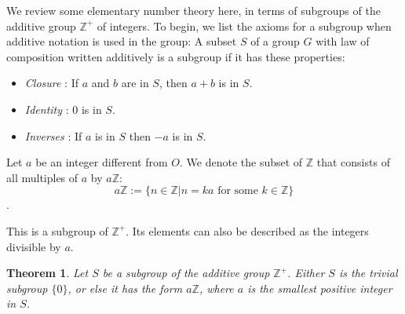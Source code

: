 \documentclass[
]{book}
\providecommand{\tightlist}{%
  \setlength{\itemsep}{0pt}\setlength{\parskip}{0pt}}
\newtheorem{theorem}{Theorem}[chapter]
\theoremstyle{definition}
\theoremstyle{definition}
\theoremstyle{definition}
\theoremstyle{definition}
\theoremstyle{remark}
\begin{document}
We review some elementary number theory here, in terms of subgroups of the additive group \(\mathbb{Z}^+\) of integers. To begin, we list the axioms for a subgroup when additive notation is used in the group: A subset \(S\) of a group \(G\) with law of composition written additively is a subgroup if it has these properties:

\begin{itemize}
\tightlist
\item
  \emph{Closure} : If \(a\) and \(b\) are in \(S\), then \(a + b\) is in \(S\).
\item
  \emph{Identity} : \(0\) is in \(S\).
\item
  \emph{Inverses} : If \(a\) is in \(S\) then \(-a\) is in \(S\).
\end{itemize}

Let \(a\) be an integer different from \(O\).
We denote the subset of \(\mathbb{Z}\) that consists of all
multiples of \(a\) by \(a\mathbb{Z}\):
\[a\mathbb{Z} := \{n \in \mathbb{ Z} | n = ka \text{ for some } k\in \mathbb{Z}\} \].

This is a subgroup of \(\mathbb{Z}^+\). Its elements can also be described as the integers divisible by \(a\).

\begin{theorem}
\protect\hypertarget{thm:unnamed-chunk-21}{}\label{thm:unnamed-chunk-21}Let \(S\) be a subgroup of the additive group \(\mathbb{Z}^+\). Either \(S\) is the trivial subgroup
\(\{0\}\), or else it has the form \(a\mathbb{Z}\), where \(a\) is the smallest positive integer in \(S\).
\end{theorem}
\end{document}
